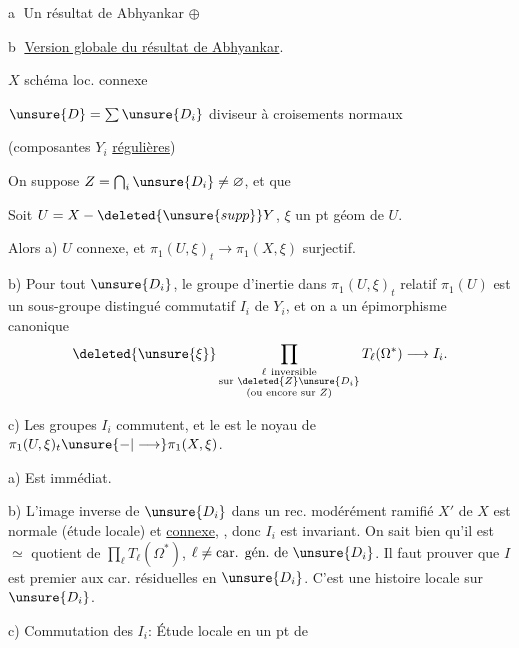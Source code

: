 
\textcircled{a} Un résultat de Abhyankar $\oplus$

\textcircled{b} \uline{Version globale du  résultat de Abhyankar}.

$X$ schéma loc.  connexe

$\unsure{D}=\sum\unsure{D_i}$ diviseur à croisements normaux

(composantes $Y_i$ \uline{régulières})

On suppose $Z=\bigcap_i\unsure{D_i}\ne\varnothing$, et que 

 Soit  $U=X-\deleted{\unsure{supp}}Y$, $\xi$ un pt géom de $U$.

Alors a) $U$ connexe, et $\pi_1(U,\xi)_t\longrightarrow\pi_1(X,\xi)$ surjectif.

b) Pour tout $\unsure{D_i}$, le groupe d'inertie dans $\pi_1(U,\xi)_t$ relatif  $\pi_1(U)$ est un sous-groupe distingué  commutatif $I_i$ de $Y_i$,  et on a un épimorphisme canonique
\[
\deleted{\unsure{\xi}}
\prod_{\substack{\ell\ \text{inversible}\\\text{sur }\deleted{Z}\unsure{D_i}\\(\text{ou encore sur }Z)}}T_\ell(\Omega^*)\longrightarrow I_i.
\]

c) Les groupes $I_i$ commutent, et le  est le noyau de $\pi_1(U,\xi)_t\unsure{-|\longrightarrow}\pi_1(X,\xi)$.

a) Est immédiat.

b) L'image inverse de $\unsure{D_i}$ dans un rec.   modérément ramifié $X'$ de $X$ est normale (étude locale) et \uline{connexe},  , donc $I_i$ est invariant. On sait bien qu'il est $\simeq$ quotient de $\prod_\ell T_\ell(\Omega^*)$, $\ell\ne\text{car. gén.}\text{ de }\unsure{D_i}$. Il faut prouver que $I$ est premier aux car. résiduelles en $\unsure{D_i}$. C'est une histoire locale sur $\unsure{D_i}$.

c) Commutation des $I_i$:  Étude locale en un pt de
